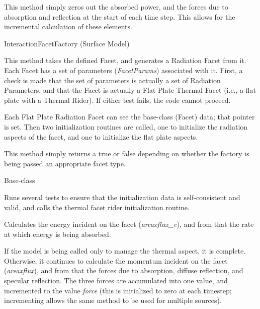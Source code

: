 {\begin{enumerate}
\begin{enumerate}
This method simply zeros out the absorbed power, and the forces due to
absorption and reflection at the start of each time step.  This allows for the
incremental calculation of these elements.


\end{enumerate}


 InteractionFacetFactory (Surface Model)


\begin{enumerate}

This method takes the defined Facet, and generates a Radiation Facet from it.
Each Facet has a set of parameters (\textit{FacetParams}) associated with it.
First, a check is made that the set of parameters is actually a set of
Radiation Parameters, and that the Facet is actually a Flat Plate Thermal Facet
(i.e., a flat plate with a Thermal Rider).  If either test fails, the code
cannot proceed.

Each Flat Plate Radiation Facet can see the base-class (Facet) data; that
pointer is set.  Then two initialization routines are called, one to initialize
the radiation aspects of the facet, and one to initialize the flat plate
aspects.

This method simply returns a true or false depending on whether the factory is
being passed an appropriate facet type.


\end{enumerate}


 Base-class


\begin{enumerate}

Runs several tests to ensure that the initialization data is self-consistent
and valid, and calls the thermal facet rider initialization routine.

Calculates the energy incident on the facet (\textit{areaxflux\_e}), and from
that the rate at which energy is being absorbed.

If the model is being called only to manage the thermal aspect, it is complete.
Otherwise, it continues to calculate the momentum incident on the facet
(\textit{areaxflux}), and from that the forces due to absorption, diffuse
reflection, and specular reflection.  The three forces are accumulated into one
value, and incremented to the value \textit{force} (this is initialized to zero
at each timestep; incrementing allows the same method to be used for multiple
sources).


\end{enumerate}
\end{enumerate}}
